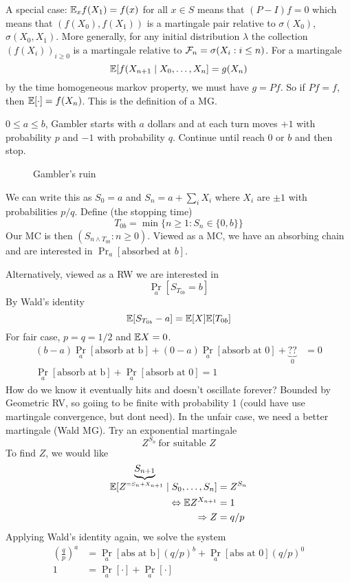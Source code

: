A special case: $\mathbb{E}_x f(X_1) = f(x)$ for all
$x \in S$ means that $(P - I) f = 0$ which means
that $(f(X_0), f(X_1))$ is a martingale
pair relative to $\sigma(X_0)$, $\sigma(X_0, X_1)$.
More generally, for any initial distribution $\lambda$ the collection $(f(X_i))_{i \geq 0}$
is
a martingale relative to $\mathcal{F}_n = \sigma(X_i : i \leq n)$. For a martingale
\[
  \mathbb{E}[f(X_{n+1} \mid X_0, \ldots, X_n] = g(X_n)
\]
by the time homogeneous markov property, we must
have $g = P f$. So if $P f = f$, then
$\mathbb{E}[\cdot] = f(X_n)$. This is the definition
of a MG.

\begin{example}
  \label{eg:gamblers-ruin}

  $0 \leq a \leq b$, Gambler starts with $a$ dollars
  and at each turn moves $+1$ with probability $p$
  and $-1$ with probability $q$. Continue until
  reach $0$ or $b$ and then stop.

  \begin{figure}[H]
    \centering
    \caption{Gambler's ruin}
    \label{fig:gamblers-ruin}
  \end{figure}

  We can write this as $S_0 = a$ and $S_n = a + \sum_i X_i$ where $X_i$ are $\pm 1$ with probabilities
  $p/q$. Define (the stopping time)
  \[
    T_{0b} = \min\{n \geq 1 : S_n \in \{0,b\}\}
  \]
  Our MC is then $(S_{n \land T_{0b}} : n \geq 0)$.
  Viewed as a MC, we have an absorbing chain and are interested
  in $\Pr_a[\text{absorbed at $b$}]$.

  Alternatively, viewed as a RW we are interested in
  \[
    \Pr_a[S_{T_{0b}} = b]
  \]
  By Wald's identity
  \[
    \mathbb{E}[S_{T_{0b}} - a]
    = \mathbb{E}[X] \mathbb{E}[T_{0b}]
  \]
  For fair case, $p = q = 1/2$ and $\mathbb{E} X = 0$.
  \begin{align*}
    (b-a) \Pr_a[\text{absorb at b}] + (0 - a) \Pr_a[\text{absorb at 0}] + \underbrace{??}_{0} &= 0 \\
    \Pr_a[\text{absorb at b}] + \Pr_a[\text{absorb at 0}] = 1
  \end{align*}
  How do we know it eventually hits and doesn't oscillate forever?
  Bounded by Geometric RV, so goiing to be finite with probability 1
  (could have use martingale convergence, but dont need).
  In the unfair case, we need a better martingale (Wald MG). Try an
  exponential martingale
  \[
    Z^{S_n}~\text{for suitable $Z$}
  \]
  To find $Z$, we would like
  \begin{align*}
    \mathbb{E}[Z^{\underbrace{S_{n+1}}_{=S_n + X_{n+1}}} \mid S_0, \ldots, S_n] &= Z^{S_n} \\
    \Leftrightarrow \mathbb{E} Z^{X_{n+1}} &= 1 \\
    \Rightarrow Z &= q/p
  \end{align*}
  Applying Wald's identity again, we solve the system
  \begin{align*}
    \left(\frac{q}{p} \right)^a &= \Pr_a[\text{abs at b}] (q/p)^b + \Pr_a[\text{abs at 0}](q/p)^0 \\
    1 &= \Pr_a[\cdot] + \Pr_a[\cdot]
  \end{align*}


\end{example}
